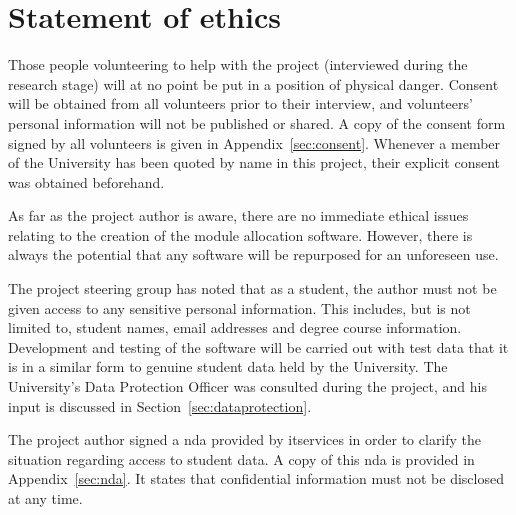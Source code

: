\documentclass[twoside,draft]{scrartcl}
\let\stdsection\section
\renewcommand\section{\clearpage\stdsection}
\begin{document}
\clearpage
\tableofcontents

\clearpage
\listoffigures

\section{Statement of ethics}


Those people volunteering to help with the project (interviewed during the
research stage) will at no point be put in a position of physical danger.
Consent will be obtained from all volunteers prior to their interview, and
volunteers' personal information will not be published or shared. A copy of
the consent form signed by all volunteers is given in
Appendix~\ref{sec:consent}. Whenever a member of the University has been
quoted by name in this project, their explicit consent was obtained
beforehand.


As far as the project author is aware, there are no immediate ethical issues
relating to the creation of the module allocation software. However, there is
always the potential that any software will be repurposed for an unforeseen
use.


The project steering group has noted that as a student, the author must not be
given access to any sensitive personal information. This includes, but is not
limited to, student names, email addresses and degree course information.
Development and testing of the software will be carried out with test data
that it is in a similar form to genuine student data held by the University.
The University's Data Protection Officer was consulted during the project, and
his input is discussed in Section~\ref{sec:dataprotection}.

The project author signed a \gls{nda} provided by \gls{itservices} in order to
clarify the situation regarding access to student data. A copy of this
\gls{nda} is provided in Appendix~\ref{sec:nda}. It states that confidential
information must not be disclosed at any time.










\end{document}
